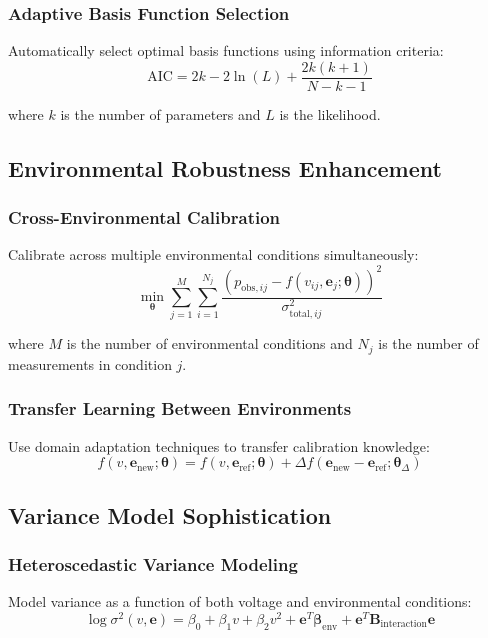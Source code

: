 \documentclass[11pt]{article}
\begin{document}
\subsubsection{Adaptive Basis Function Selection}
Automatically select optimal basis functions using information criteria:
\begin{equation}
\text{AIC} = 2k - 2\ln(L) + \frac{2k(k+1)}{N-k-1}
\end{equation}

where $k$ is the number of parameters and $L$ is the likelihood.

\subsection{Environmental Robustness Enhancement}

\subsubsection{Cross-Environmental Calibration}
Calibrate across multiple environmental conditions simultaneously:
\begin{equation}
\min_{\bm{\theta}} \sum_{j=1}^{M} \sum_{i=1}^{N_j} \frac{(p_{\text{obs},ij} - f(v_{ij}, \mathbf{e}_j; \bm{\theta}))^2}{\sigma_{\text{total},ij}^2}
\end{equation}

where $M$ is the number of environmental conditions and $N_j$ is the number of measurements in condition $j$.

\subsubsection{Transfer Learning Between Environments}
Use domain adaptation techniques to transfer calibration knowledge:
\begin{equation}
f(v, \mathbf{e}_{\text{new}}; \bm{\theta}) = f(v, \mathbf{e}_{\text{ref}}; \bm{\theta}) + \Delta f(\mathbf{e}_{\text{new}} - \mathbf{e}_{\text{ref}}; \bm{\theta}_{\Delta})
\end{equation}

\subsection{Variance Model Sophistication}

\subsubsection{Heteroscedastic Variance Modeling}
Model variance as a function of both voltage and environmental conditions:
\begin{equation}
\log \sigma^2(v, \mathbf{e}) = \beta_0 + \beta_1 v + \beta_2 v^2 + \mathbf{e}^T \bm{\beta}_{\text{env}} + \mathbf{e}^T \mathbf{B}_{\text{interaction}} \mathbf{e}
\end{equation}
\end{document}

